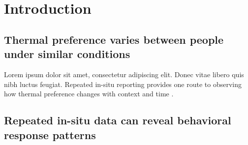 \documentclass[final,5p,times,twocolumn]{elsarticle}
\begin{document}
\section{Introduction}\label{sec:introduction}

%

\subsection{Thermal preference varies between people under similar conditions}\label{sec:individual-differences}
Lorem ipsum dolor sit amet, consectetur adipiscing elit. Donec vitae libero quis
nibh luctus feugiat. Repeated in-situ reporting provides one route to observing
how thermal preference changes with context and time \cite{Stone1994-he}.

\subsection{Repeated in-situ data can reveal behavioral response patterns}\label{sec:longitudinal-data}
\lipsum[1]


\end{document}
